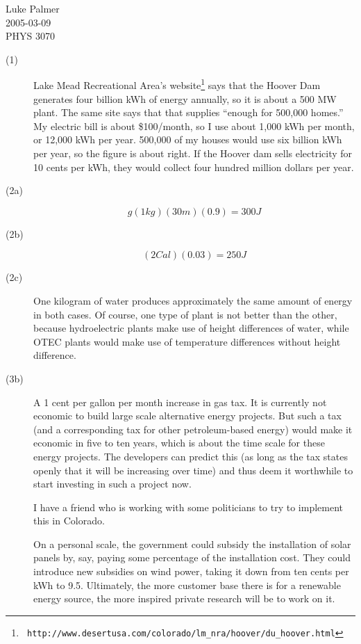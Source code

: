 \documentclass[12pt]{article}
\begin{document}
\noindent
Luke Palmer \\
2005-03-09 \\
PHYS 3070

\begin{description}
\item[(1)] Lake Mead Recreational Area's website\footnote{\texttt{
http://www.desertusa.com/colorado/lm\_nra/hoover/du\_hoover.html}} says
that the Hoover Dam generates four billion kWh of energy annually, so it
is about a 500 MW plant.  The same site says that that supplies ``enough
for 500,000 homes.''  My electric bill is about \$100/month, so I use
about 1,000 kWh per month, or 12,000 kWh per year.  500,000 of my houses
would use six billion kWh per year, so the figure is about right.  If
the Hoover dam sells electricity for 10 cents per kWh, they would
collect four hundred million dollars per year.

\item[(2a)] \[
    g(1 \mathit{kg})(30m)(0.9) = 300 J
\]
\item[(2b)] \[
    (2 Cal)(0.03) = 250 J
\]
\item[(2c)] One kilogram of water produces approximately the same amount
of energy in both cases.  Of course, one type of plant is not better
than the other, because hydroelectric plants make use of height
differences of water, while OTEC plants would make use of temperature
differences without height difference.

\item[(3b)] A 1 cent per gallon per month increase in gas tax.  It is
currently not economic to build large scale alternative energy projects.
But such a tax (and a corresponding tax for other petroleum-based
energy) would make it economic in five to ten years, which is about the
time scale for these energy projects.  The developers can predict this
(as long as the tax states openly that it will be increasing over time)
and thus deem it worthwhile to start investing in such a project now.

I have a friend who is working with some politicians to try to implement
this in Colorado.

On a personal scale, the government could subsidy the installation of
solar panels by, say, paying some percentage of the installation cost.
They could introduce new subsidies on wind power, taking it down from
ten cents per kWh to 9.5.  Ultimately, the more customer base there is
for a renewable energy source, the more inspired private research will
be to work on it.

\end{description}
\end{document}
